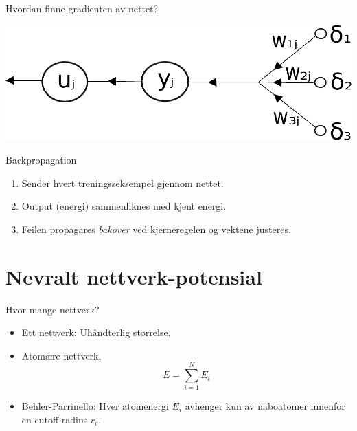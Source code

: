 \documentclass{beamer}
\begin{document}
\begin{frame}{Hvordan finne gradienten av nettet?}
 
\centering
\includegraphics[width = 0.8\linewidth]{../Figures/Theory/backprop.pdf}

\begin{block}{Backpropagation}
 \begin{enumerate}
  \item Sender hvert treningsseksempel gjennom nettet. 
  \item Output (energi) sammenliknes med kjent energi. 
  \item Feilen propagares \textit{bakover} ved kjerneregelen og vektene justeres. 
 \end{enumerate}
\end{block}
 
\end{frame}


\section{Nevralt nettverk-potensial}


\begin{frame}
 
\begin{block}{Hvor mange nettverk?}
 \begin{itemize}
  \item Ett nettverk: Uhåndterlig størrelse. 
  \item Atomære nettverk,
   \begin{equation*}
    E = \sum_{i=1}^N E_i
   \end{equation*}
   \item Behler-Parrinello: Hver atomenergi $E_i$ avhenger kun av naboatomer innenfor en cutoff-radius $r_c$. 
 \end{itemize}
\end{block}

\end{frame}
\end{document}
